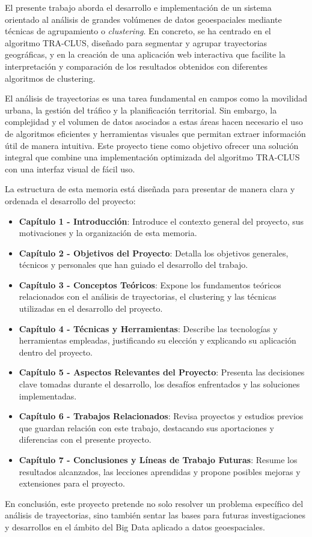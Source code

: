 
El presente trabajo aborda el desarrollo e implementación de un sistema orientado al análisis de grandes volúmenes de datos geoespaciales mediante técnicas de agrupamiento o \textit{clustering}. En concreto, se ha centrado en el algoritmo TRA-CLUS, diseñado para segmentar y agrupar trayectorias geográficas, y en la creación de una aplicación web interactiva que facilite la interpretación y comparación de los resultados obtenidos con diferentes algoritmos de clustering.

El análisis de trayectorias es una tarea fundamental en campos como la movilidad urbana, la gestión del tráfico y la planificación territorial. Sin embargo, la complejidad y el volumen de datos asociados a estas áreas hacen necesario el uso de algoritmos eficientes y herramientas visuales que permitan extraer información útil de manera intuitiva. Este proyecto tiene como objetivo ofrecer una solución integral que combine una implementación optimizada del algoritmo TRA-CLUS con una interfaz visual de fácil uso.

La estructura de esta memoria está diseñada para presentar de manera clara y ordenada el desarrollo del proyecto:

\begin{itemize}
    \item \textbf{Capítulo 1 - Introducción}: Introduce el contexto general del proyecto, sus motivaciones y la organización de esta memoria.
    \item \textbf{Capítulo 2 - Objetivos del Proyecto}: Detalla los objetivos generales, técnicos y personales que han guiado el desarrollo del trabajo.
    \item \textbf{Capítulo 3 - Conceptos Teóricos}: Expone los fundamentos teóricos relacionados con el análisis de trayectorias, el clustering y las técnicas utilizadas en el desarrollo del proyecto.
    \item \textbf{Capítulo 4 - Técnicas y Herramientas}: Describe las tecnologías y herramientas empleadas, justificando su elección y explicando su aplicación dentro del proyecto.
    \item \textbf{Capítulo 5 - Aspectos Relevantes del Proyecto}: Presenta las decisiones clave tomadas durante el desarrollo, los desafíos enfrentados y las soluciones implementadas.
    \item \textbf{Capítulo 6 - Trabajos Relacionados}: Revisa proyectos y estudios previos que guardan relación con este trabajo, destacando sus aportaciones y diferencias con el presente proyecto.
    \item \textbf{Capítulo 7 - Conclusiones y Líneas de Trabajo Futuras}: Resume los resultados alcanzados, las lecciones aprendidas y propone posibles mejoras y extensiones para el proyecto.
\end{itemize}

En conclusión, este proyecto pretende no solo resolver un problema específico del análisis de trayectorias, sino también sentar las bases para futuras investigaciones y desarrollos en el ámbito del Big Data aplicado a datos geoespaciales.
